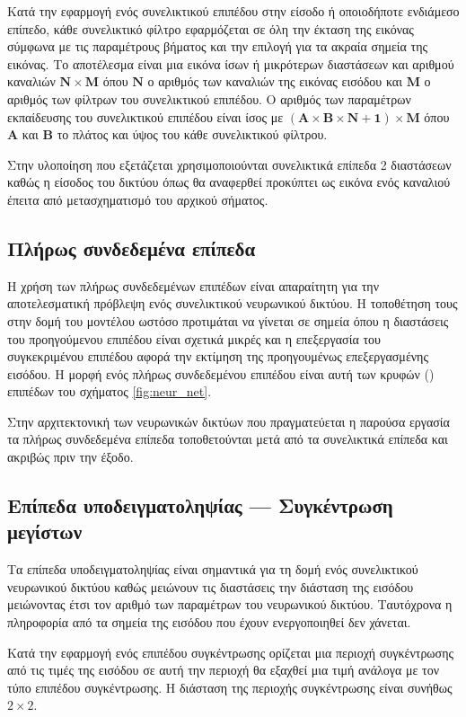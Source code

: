 Κατά την εφαρμογή ενός συνελικτικού επιπέδου στην είσοδο ή οποιοδήποτε ενδιάμεσο επίπεδο, κάθε συνελικτικό φίλτρο εφαρμόζεται σε όλη την έκταση της εικόνας σύμφωνα με τις παραμέτρους βήματος και την επιλογή για τα ακραία σημεία της εικόνας. Το αποτέλεσμα είναι μια εικόνα ίσων ή μικρότερων διαστάσεων και αριθμού καναλιών $\mathbf{N\times M}$ όπου $\mathbf{N}$ ο αριθμός των καναλιών της εικόνας εισόδου και $\mathbf{M}$ ο αριθμός των φίλτρων του συνελικτικού επιπέδου. Ο αριθμός των παραμέτρων εκπαίδευσης του συνελικτικού επιπέδου είναι ίσος με $\mathbf{\left(A \times B\times N+1\right)\times M}$ όπου $\mathbf{A}$ και $\mathbf{B}$ το πλάτος και ύψος του κάθε συνελικτικού φίλτρου.

Στην υλοποίηση που εξετάζεται χρησιμοποιούνται συνελικτικά επίπεδα 2 διαστάσεων καθώς η είσοδος του δικτύου όπως θα αναφερθεί προκύπτει ως εικόνα ενός καναλιού έπειτα από μετασχηματισμό του αρχικού σήματος.

\subsection{Πλήρως συνδεδεμένα επίπεδα}
Η χρήση των πλήρως συνδεδεμένων επιπέδων είναι απαραίτητη για την αποτελεσματική πρόβλεψη ενός συνελικτικού νευρωνικού δικτύου. Η τοποθέτηση τους στην δομή του μοντέλου ωστόσο προτιμάται να γίνεται σε σημεία όπου η διαστάσεις του προηγούμενου επιπέδου είναι σχετικά μικρές και η επεξεργασία του συγκεκριμένου επιπέδου αφορά την εκτίμηση της προηγουμένως επεξεργασμένης εισόδου. Η μορφή ενός πλήρως συνδεδεμένου επιπέδου είναι αυτή των κρυφών (\textbf{}) επιπέδων του σχήματος \ref{fig:neur_net}.

Στην αρχιτεκτονική των νευρωνικών δικτύων που πραγματεύεται η παρούσα εργασία τα πλήρως συνδεδεμένα επίπεδα τοποθετούνται μετά από τα συνελικτικά επίπεδα και ακριβώς πριν την έξοδο.

\subsection{Επίπεδα υποδειγματοληψίας --- Συγκέντρωση μεγίστων }
Τα επίπεδα υποδειγματοληψίας είναι σημαντικά για τη δομή ενός συνελικτικού νευρωνικού δικτύου καθώς μειώνουν τις διαστάσεις την διάσταση της εισόδου μειώνοντας έτσι τον αριθμό των παραμέτρων του νευρωνικού δικτύου. Ταυτόχρονα η πληροφορία από τα σημεία της εισόδου που έχουν ενεργοποιηθεί δεν χάνεται. 

Κατά την εφαρμογή ενός επιπέδου συγκέντρωσης ορίζεται μια περιοχή συγκέντρωσης από τις τιμές της εισόδου σε αυτή την περιοχή θα εξαχθεί μια τιμή ανάλογα με τον τύπο επιπέδου συγκέντρωσης. Η διάσταση της περιοχής συγκέντρωσης είναι συνήθως $2\times2$. 

